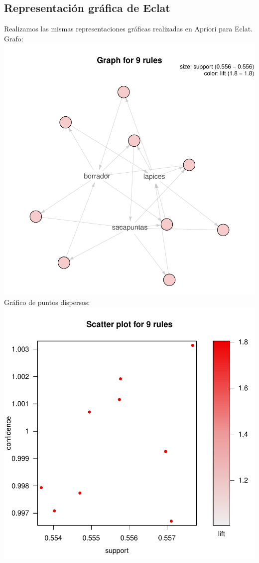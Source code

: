 \documentclass [a4paper] {article}
\begin{document}
\subsection{Representación gráfica de Eclat}
Realizamos las mismas representaciones gráficas realizadas en Apriori para Eclat.
Grafo:
\newline
\includegraphics{Memoria-Figura 15}
\newline
Gráfico de puntos dispersos:
\newline
\includegraphics{Memoria-Figura 16}
\newline
\end{document}
